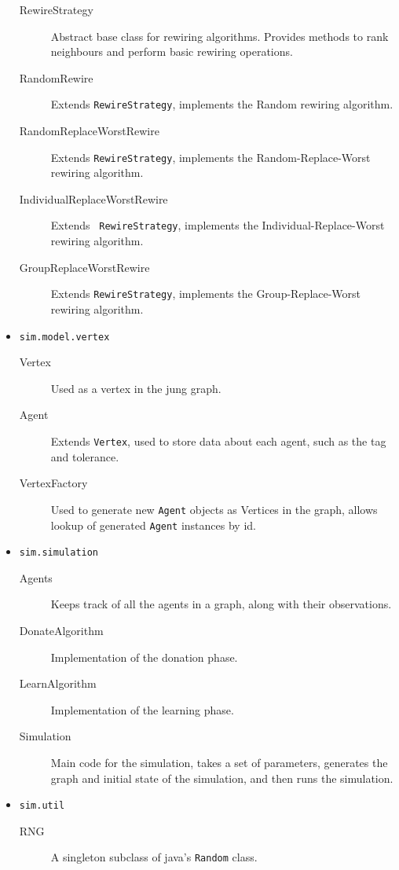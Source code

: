 \begin{itemize}
    \begin{description}
        \item[RewireStrategy] Abstract base class for rewiring
        algorithms. Provides methods to rank neighbours and perform
        basic rewiring operations.
        \item[RandomRewire] Extends {\tt RewireStrategy}, implements the
        Random rewiring algorithm.
        \item[RandomReplaceWorstRewire] Extends {\tt RewireStrategy},
        implements the Random-Replace-Worst rewiring algorithm.
        \item[IndividualReplaceWorstRewire] Extends {\tt
        RewireStrategy}, implements the Individual-Replace-Worst
        rewiring algorithm.
        \item[GroupReplaceWorstRewire] Extends {\tt RewireStrategy},
        implements the Group-Replace-Worst rewiring algorithm.
    \end{description}

    \item {\tt sim.model.vertex}

    \begin{description}
        \item[Vertex] Used as a vertex in the {\sc jung} graph.
        \item[Agent] Extends {\tt Vertex}, used to store data about each
        agent, such as the tag and tolerance.
        \item[VertexFactory] Used to generate new {\tt Agent} objects as
        Vertices in the graph, allows lookup of generated {\tt Agent}
        instances by id.
    \end{description}

    \item {\tt sim.simulation}

    \begin{description}
        \item[Agents] Keeps track of all the agents in a graph, along
        with their observations.
        \item[DonateAlgorithm] Implementation of the donation phase.
        \item[LearnAlgorithm] Implementation of the learning phase.
        \item[Simulation] Main code for the simulation, takes a set of
        parameters, generates the graph and initial state of the
        simulation, and then runs the simulation.
    \end{description}

    \item {\tt sim.util}

    \begin{description}
        \item[RNG] A singleton subclass of java's {\tt Random} class.
    \end{description}

\end{itemize}
